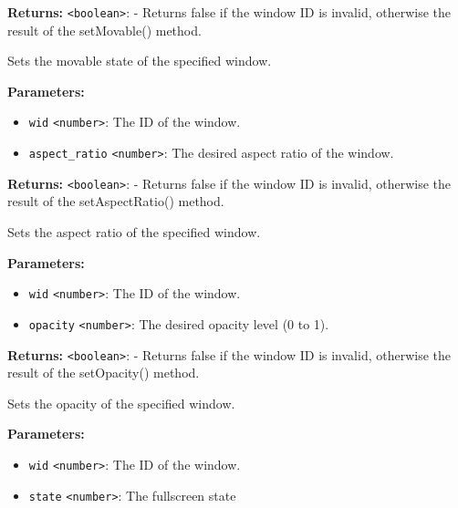 \documentclass[12pt,a4paper]{article}
\begin{document}
\noindent \textbf{Returns:} \texttt{<boolean>}: - Returns false if the window ID is invalid, otherwise the result of the setMovable() method.

\noindent Sets the movable state of the specified window.

\vspace{5mm}
\noindent {}


\noindent \textbf{Parameters:}
\begin{itemize}
  \item \texttt{wid} \texttt{<number>}: The ID of the window.
  \item \texttt{aspect\_ratio} \texttt{<number>}: The desired aspect ratio of the window.
\end{itemize}

\noindent \textbf{Returns:} \texttt{<boolean>}: - Returns false if the window ID is invalid, otherwise the result of the setAspectRatio() method.

\noindent Sets the aspect ratio of the specified window.

\vspace{5mm}
\noindent {}


\noindent \textbf{Parameters:}
\begin{itemize}
  \item \texttt{wid} \texttt{<number>}: The ID of the window.
  \item \texttt{opacity} \texttt{<number>}: The desired opacity level (0 to 1).
\end{itemize}

\noindent \textbf{Returns:} \texttt{<boolean>}: - Returns false if the window ID is invalid, otherwise the result of the setOpacity() method.

\noindent Sets the opacity of the specified window.

\vspace{5mm}
\noindent {}


\noindent \textbf{Parameters:}
\begin{itemize}
  \item \texttt{wid} \texttt{<number>}: The ID of the window.
  \item \texttt{state} \texttt{<number>}: The fullscreen state
\end{itemize}
\end{document}
